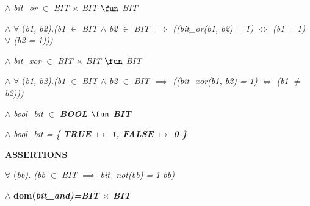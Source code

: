 \hspace*{0.20in}

\hspace*{0.20in} $\land$  \it bit\_or  $\in$  \it BIT  $\times$  \it BIT  $\fun$  \it BIT 

\hspace*{0.20in} $\land$   $\forall$ \rm (\it b1\rm , \it b2\rm )\rm .\rm (\it b1  $\in$  \it BIT  $\land$  \it b2  $\in$  \it BIT  $\implies$  \rm (\rm (\it bit\_or\rm (\it b1\rm , \it b2\rm ) \rm = \rm 1\rm )  $\iff$  \rm (\it b1 \rm = \rm 1\rm )  $\lor$  \rm (\it b2 \rm = \rm 1\rm )\rm )\rm )

\hspace*{0.20in}

\hspace*{0.20in} 

\hspace*{0.20in}

\hspace*{0.20in} $\land$  \it bit\_xor  $\in$  \it BIT  $\times$  \it BIT  $\fun$  \it BIT 

\hspace*{0.20in} $\land$   $\forall$  \rm (\it b1\rm , \it b2\rm )\rm .\rm (\it b1  $\in$  \it BIT  $\land$  \it b2  $\in$  \it BIT  $\implies$  \rm (\rm (\it bit\_xor\rm (\it b1\rm , \it b2\rm ) \rm = \rm 1\rm )  $\iff$  \rm (\it b1  $\not =$  \it b2\rm )\rm )\rm )

\hspace*{0.20in}

\hspace*{0.20in} 

\hspace*{0.20in} $\land$  \it bool\_bit  $\in$  \bf BOOL  $\fun$  \it BIT 

\hspace*{0.20in} $\land$  \it bool\_bit \rm = \rm \{ \bf TRUE  $\mapsto$  \rm 1\rm , \bf FALSE  $\mapsto$  \rm 0 \rm \}

\vspace*{4mm}
\bf ASSERTIONS

\hspace*{0.40in}

\hspace*{0.20in} $\forall$  \rm (\it bb\rm )\rm . \rm (\it bb  $\in$  \it BIT  $\implies$  \it bit\_not\rm (\it bb\rm ) \rm = \rm 1\rm -\it bb\rm ) 

\vspace*{4mm}
\hspace*{0.20in} $\land$  \bf dom\rm (\it bit\_and\rm )\rm =\it BIT $\times$ \it BIT

